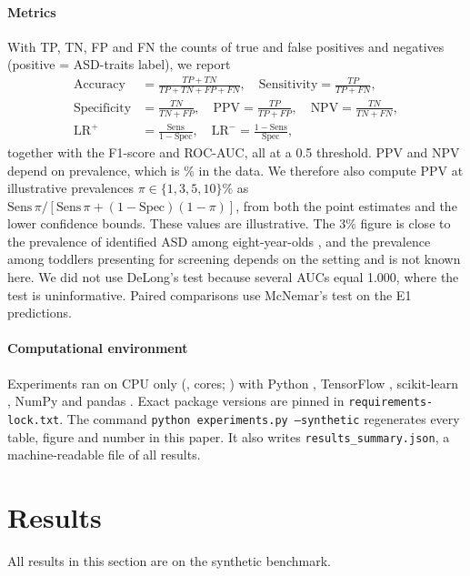 \documentclass[5p,times,twocolumn]{elsarticle}
\begin{document}
\paragraph{Metrics} With TP, TN, FP and FN the counts of true and false positives and negatives (positive = ASD-traits label), we report
\begin{align}
\text{Accuracy} &= \tfrac{TP+TN}{TP+TN+FP+FN}, \quad
\text{Sensitivity} = \tfrac{TP}{TP+FN}, \\
\text{Specificity} &= \tfrac{TN}{TN+FP}, \quad
\text{PPV} = \tfrac{TP}{TP+FP}, \quad
\text{NPV} = \tfrac{TN}{TN+FN}, \\
\text{LR}^{+} &= \tfrac{\text{Sens}}{1-\text{Spec}}, \quad
\text{LR}^{-} = \tfrac{1-\text{Sens}}{\text{Spec}},
\end{align}
together with the F1-score and ROC-AUC, all at a 0.5 threshold. PPV and NPV depend on prevalence, which is \PctASD\% in the data. We therefore also compute PPV at illustrative prevalences $\pi\in\{1,3,5,10\}\%$ as $\text{Sens}\,\pi/[\text{Sens}\,\pi+(1-\text{Spec})(1-\pi)]$, from both the point estimates and the lower confidence bounds. These values are illustrative. The 3\% figure is close to the prevalence of identified ASD among eight-year-olds \cite{shaw2025}, and the prevalence among toddlers presenting for screening depends on the setting and is not known here. We did not use DeLong's test \cite{delong1988} because several AUCs equal 1.000, where the test is uninformative. Paired comparisons use McNemar's test on the E1 predictions.

\paragraph{Computational environment} Experiments ran on CPU only (\EnvCPU, \EnvNCPU{} cores; \EnvOS) with Python \EnvPython, TensorFlow \EnvTF, scikit-learn \EnvSklearn, NumPy \EnvNumpy{} and pandas \EnvPandas. Exact package versions are pinned in \texttt{requirements-lock.txt}. The command \texttt{python experiments.py --synthetic} regenerates every table, figure and number in this paper. It also writes \texttt{results\_summary.json}, a machine-readable file of all results.

\section{Results}
\label{sec:results}

All results in this section are on the synthetic benchmark.
\end{document}
